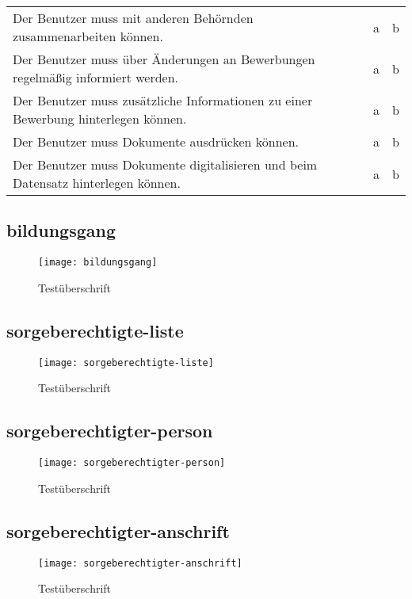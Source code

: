 \begin{landscape}
\begin{longtable}{p{15cm}cc}
            Der Benutzer muss mit anderen Behörnden zusammenarbeiten können. & a & b \\
            Der Benutzer muss über Änderungen an Bewerbungen regelmäßig informiert werden. & a & b \\
            Der Benutzer muss zusätzliche Informationen zu einer Bewerbung hinterlegen können. & a & b \\
            Der Benutzer muss Dokumente ausdrücken können. & a & b \\
            Der Benutzer muss Dokumente digitalisieren und beim Datensatz hinterlegen können. & a & b \\
    \end{longtable}




\subsection{bildungsgang}
\begin{figure}[H]
    \centering
    \caption{Testüberschrift}
    \begin{adjustbox}{width=\linewidth, center}
        \texttt{[image: bildungsgang]}
    \end{adjustbox}
\end{figure}

\subsection{sorgeberechtigte-liste}
\begin{figure}[H]
    \centering
    \caption{Testüberschrift}
    \begin{adjustbox}{width=\linewidth, center}
        \texttt{[image: sorgeberechtigte-liste]}
    \end{adjustbox}
\end{figure}

\subsection{sorgeberechtigter-person}
\begin{figure}[H]
    \centering
    \caption{Testüberschrift}
    \begin{adjustbox}{width=0.5\linewidth, center}
        \texttt{[image: sorgeberechtigter-person]}
    \end{adjustbox}
\end{figure}

\subsection{sorgeberechtigter-anschrift}
\begin{figure}[H]
    \centering
    \caption{Testüberschrift}
    \begin{adjustbox}{width=0.85\linewidth, center}
        \texttt{[image: sorgeberechtigter-anschrift]}
    \end{adjustbox}
\end{figure}


\end{landscape}
